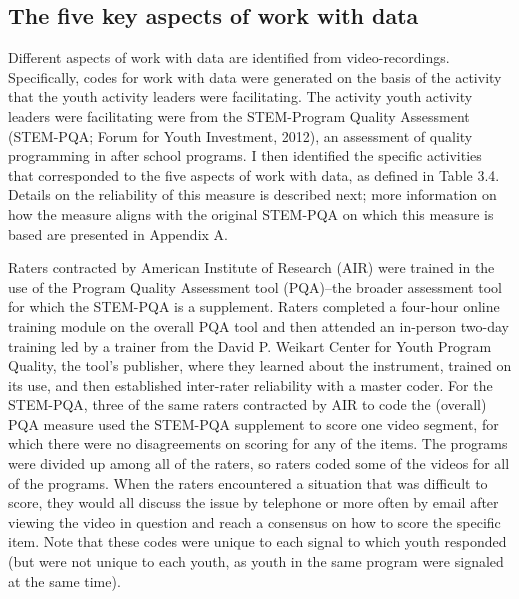 \documentclass[]{msu-thesis}
\theoremstyle{definition}
\theoremstyle{definition}
\theoremstyle{definition}
\theoremstyle{remark}
\begin{document}
\subsection{The five key aspects of work with
data}\label{the-five-key-aspects-of-work-with-data}

Different aspects of work with data are identified from
video-recordings. Specifically, codes for work with data were generated
on the basis of the activity that the youth activity leaders were
facilitating. The activity youth activity leaders were facilitating were
from the STEM-Program Quality Assessment (STEM-PQA; Forum for Youth
Investment, 2012), an assessment of quality programming in after school
programs. I then identified the specific activities that corresponded to
the five aspects of work with data, as defined in Table 3.4. Details on
the reliability of this measure is described next; more information on
how the measure aligns with the original STEM-PQA on which this measure
is based are presented in Appendix A.

Raters contracted by American Institute of Research (AIR) were trained
in the use of the Program Quality Assessment tool (PQA)--the broader
assessment tool for which the STEM-PQA is a supplement. Raters completed
a four-hour online training module on the overall PQA tool and then
attended an in-person two-day training led by a trainer from the David
P. Weikart Center for Youth Program Quality, the tool's publisher, where
they learned about the instrument, trained on its use, and then
established inter-rater reliability with a master coder. For the
STEM-PQA, three of the same raters contracted by AIR to code the
(overall) PQA measure used the STEM-PQA supplement to score one video
segment, for which there were no disagreements on scoring for any of the
items. The programs were divided up among all of the raters, so raters
coded some of the videos for all of the programs. When the raters
encountered a situation that was difficult to score, they would all
discuss the issue by telephone or more often by email after viewing the
video in question and reach a consensus on how to score the specific
item. Note that these codes were unique to each signal to which youth
responded (but were not unique to each youth, as youth in the same
program were signaled at the same time).
\end{document}
